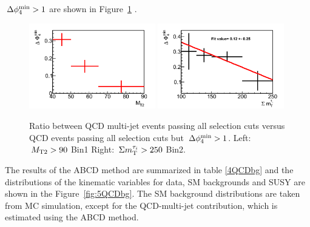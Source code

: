 $\,{\Delta\phi_{4}^{\rm min}}>1$ are shown in Figure~\ref{fig:3QCDbg} .
\begin{figure}[htbp]
\centering
\includegraphics[width=0.49\textwidth]{QCDbginTauTau/Bin1_miscefficiency.png}
\includegraphics[width=0.49\textwidth]{QCDbginTauTau/Bin2_miscefficiency.png} \\
\caption{ Ratio between QCD multi-jet events passing all selection cuts versus QCD events
passing all selection cuts but $\,{\Delta\phi_{4}^{\rm min}}>1$. Left: $\,{M_{\rm T2}}>90$ Bin1 Right: $\,\Sigma m_{\rm T}^{\tau_i} >250$ Bin2.}
\label{fig:3QCDbg}
\end{figure}
The results of the ABCD method are summarized in table \ref{4QCDbg} and the distributions of the kinematic variables for data, SM backgrounds and SUSY are shown in the Figure~\ref{fig:5QCDbg}. The SM background distributions
are taken from MC simulation, except for the QCD-multi-jet contribution, which is estimated
using the ABCD method.
